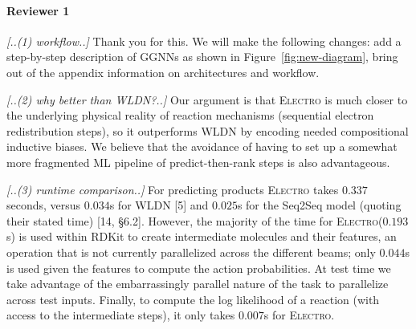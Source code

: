 \documentclass{article}
\newcommand{\ourModel}{\textsc{Electro}\xspace}
\begin{document}
\vspace{-5pt}
\paragraph{Reviewer 1}

\emph{[..(1) workflow..]}
Thank you for this. We will make the following changes: add a step-by-step description of GGNNs as shown in Figure~\ref{fig:new-diagram}, bring out of the appendix information on architectures and workflow. 

\emph{[..(2) why better than WLDN?..]}
Our argument is that \ourModel is much closer to the underlying physical reality of reaction mechanisms (sequential electron redistribution steps), so it outperforms WLDN by encoding needed compositional inductive biases. 
We believe that the avoidance of having to set up a somewhat more fragmented ML pipeline of predict-then-rank steps is also advantageous.  %


\emph{[..(3) runtime comparison..]}
For predicting products %
\ourModel takes $0.337$ seconds, versus $0.034$s for WLDN [5] and $0.025$s %
for the Seq2Seq model (quoting their stated time) [14, \S6.2]. 
 However, the majority of the time for \ourModel ($0.193$s) is used within RDKit to create intermediate molecules and their features, an operation that is not currently parallelized across the different beams; only $0.044$s is used given the features to compute the action probabilities.
  At test time we take advantage of the embarrassingly parallel nature of the task to parallelize across test inputs. 
   Finally, to compute the log likelihood of a reaction (with access to the intermediate steps), it only takes $0.007$s for \ourModel. %
\end{document}
